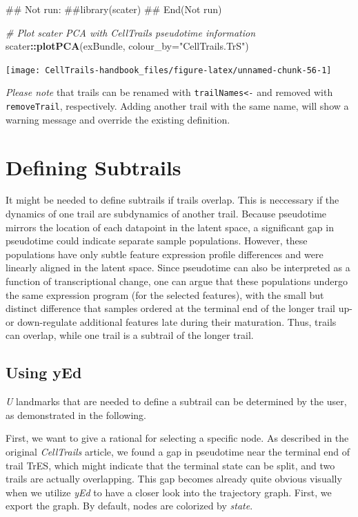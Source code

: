 \documentclass[]{book}
\newenvironment{Shaded}{\begin{snugshade}}{\end{snugshade}}
\newcommand{\KeywordTok}[1]{\textcolor[rgb]{0.13,0.29,0.53}{\textbf{#1}}}
\newcommand{\DataTypeTok}[1]{\textcolor[rgb]{0.13,0.29,0.53}{#1}}
\newcommand{\StringTok}[1]{\textcolor[rgb]{0.31,0.60,0.02}{#1}}
\newcommand{\CommentTok}[1]{\textcolor[rgb]{0.56,0.35,0.01}{\textit{#1}}}
\newcommand{\OperatorTok}[1]{\textcolor[rgb]{0.81,0.36,0.00}{\textbf{#1}}}
\newcommand{\NormalTok}[1]{#1}
\theoremstyle{definition}
\theoremstyle{definition}
\theoremstyle{definition}
\theoremstyle{remark}
\begin{document}
\begin{Shaded}
\begin{Highlighting}[]
\NormalTok{## Not run: }
\NormalTok{##library(scater)}
\NormalTok{## End(Not run)}

\CommentTok{# Plot scater PCA with CellTrails pseudotime information}
\NormalTok{scater}\OperatorTok{::}\KeywordTok{plotPCA}\NormalTok{(exBundle, }\DataTypeTok{colour_by=}\StringTok{"CellTrails.TrS"}\NormalTok{)}
\end{Highlighting}
\end{Shaded}

\texttt{[image: CellTrails-handbook\_files/figure-latex/unnamed-chunk-56-1]}

\emph{Please note} that trails can be renamed with
\texttt{trailNames\textless{}-} and removed with \texttt{removeTrail},
respectively. Adding another trail with the same name, will show a
warning message and override the existing definition.

\section{Defining Subtrails}\label{defining-subtrails}

It might be needed to define subtrails if trails overlap. This is
neccessary if the dynamics of one trail are subdynamics of another
trail. Because pseudotime mirrors the location of each datapoint in the
latent space, a significant gap in pseudotime could indicate separate
sample populations. However, these populations have only subtle feature
expression profile differences and were linearly aligned in the latent
space. Since pseudotime can also be interpreted as a function of
transcriptional change, one can argue that these populations undergo the
same expression program (for the selected features), with the small but
distinct difference that samples ordered at the terminal end of the
longer trail up- or down-regulate additional features late during their
maturation. Thus, trails can overlap, while one trail is a subtrail of
the longer trail.

\subsection{Using yEd}\label{using-yed}

\emph{U} landmarks that are needed to define a subtrail can be
determined by the user, as demonstrated in the following.

First, we want to give a rational for selecting a specific node. As
described in the original \emph{CellTrails} article, we found a gap in
pseudotime near the terminal end of trail TrES, which might indicate
that the terminal state can be split, and two trails are actually
overlapping. This gap becomes already quite obvious visually when we
utilize \emph{yEd} to have a closer look into the trajectory graph.
First, we export the graph. By default, nodes are colorized by
\emph{state}.
\end{document}
